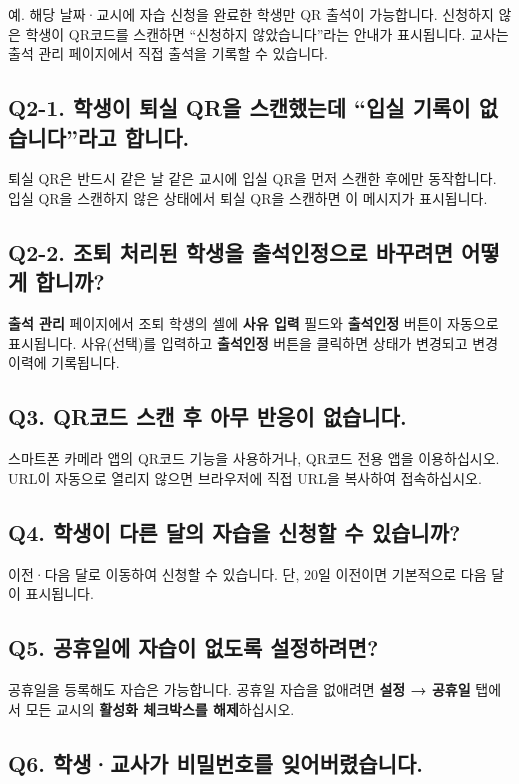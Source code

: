 \documentclass[a4paper,12pt]{article}
\newcommand{\menu}[1]{\textcolor{primary}{\textbf{#1}}}
\begin{document}
예. 해당 날짜·교시에 자습 신청을 완료한 학생만 QR 출석이 가능합니다.
신청하지 않은 학생이 QR코드를 스캔하면 ``신청하지 않았습니다''라는 안내가 표시됩니다.
교사는 출석 관리 페이지에서 직접 출석을 기록할 수 있습니다.

\subsection*{Q2-1. 학생이 퇴실 QR을 스캔했는데 ``입실 기록이 없습니다''라고 합니다.}

퇴실 QR은 반드시 같은 날 같은 교시에 입실 QR을 먼저 스캔한 후에만 동작합니다.
입실 QR을 스캔하지 않은 상태에서 퇴실 QR을 스캔하면 이 메시지가 표시됩니다.

\subsection*{Q2-2. 조퇴 처리된 학생을 출석인정으로 바꾸려면 어떻게 합니까?}

\menu{출석 관리} 페이지에서 조퇴 학생의 셀에 \menu{사유 입력} 필드와
\menu{출석인정} 버튼이 자동으로 표시됩니다.
사유(선택)를 입력하고 \menu{출석인정} 버튼을 클릭하면 상태가 변경되고
변경 이력에 기록됩니다.

\subsection*{Q3. QR코드 스캔 후 아무 반응이 없습니다.}

스마트폰 카메라 앱의 QR코드 기능을 사용하거나, QR코드 전용 앱을 이용하십시오.
URL이 자동으로 열리지 않으면 브라우저에 직접 URL을 복사하여 접속하십시오.

\subsection*{Q4. 학생이 다른 달의 자습을 신청할 수 있습니까?}

이전·다음 달로 이동하여 신청할 수 있습니다.
단, 20일 이전이면 기본적으로 다음 달이 표시됩니다.

\subsection*{Q5. 공휴일에 자습이 없도록 설정하려면?}

공휴일을 등록해도 자습은 가능합니다.
공휴일 자습을 없애려면 \menu{설정 → 공휴일} 탭에서 모든 교시의 \textbf{활성화 체크박스를 해제}하십시오.

\subsection*{Q6. 학생·교사가 비밀번호를 잊어버렸습니다.}
\end{document}
